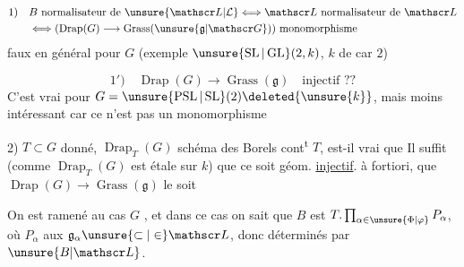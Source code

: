 \[
\begin{aligned}
1)\quad &B\text{ normalisateur de }\unsure{\mathscr L|\mathcal L}\Longleftrightarrow\mathscr L\text{ normalisateur de }\mathscr L\\
&\Longleftrightarrow(\operatorname{Drap}(G)\longrightarrow\operatorname{Grass}(\unsure{\mathfrak g|\mathscr G}))\text{ monomorphisme}
\end{aligned}
\]
faux en général pour $G$    (exemple $\unsure{\operatorname{SL}|\operatorname{GL}}(2,k)$, $k$ de car $2$)


\[
1')\quad\operatorname{Drap}(G)\longrightarrow\operatorname{Grass}(\mathfrak g)\quad\text{injectif ??}
\]
C'est vrai pour $G=\unsure{\operatorname{PSL}|\operatorname{SL}}(2)\deleted{\unsure{k}}$, mais moins intéressant car ce n'est pas un monomorphisme

\usetikzlibrary{shapes.geometric}
2) $T\subset G$  donné, $\operatorname{Drap}_{T}(G)$ schéma des Borels cont\textsuperscript{t} $T$, est-il vrai que
 Il suffit (comme $\operatorname{Drap}_{T}(G)$ est étale sur $k$) que ce soit géom. \uline{injectif}. à fortiori, que $\operatorname{Drap}(G)\to\operatorname{Grass}(\mathfrak g)$ le soit

 On est ramené au cas $G$ , et dans ce cas on sait que $B$ est  $T.\prod_{\alpha\in\unsure{\Phi|\varphi}}P_\alpha$, où    $P_\alpha$     aux $\mathfrak g_\alpha\unsure{\subset|\in}\mathscr L$, donc déterminés par $\unsure{B|\mathscr L}$.
